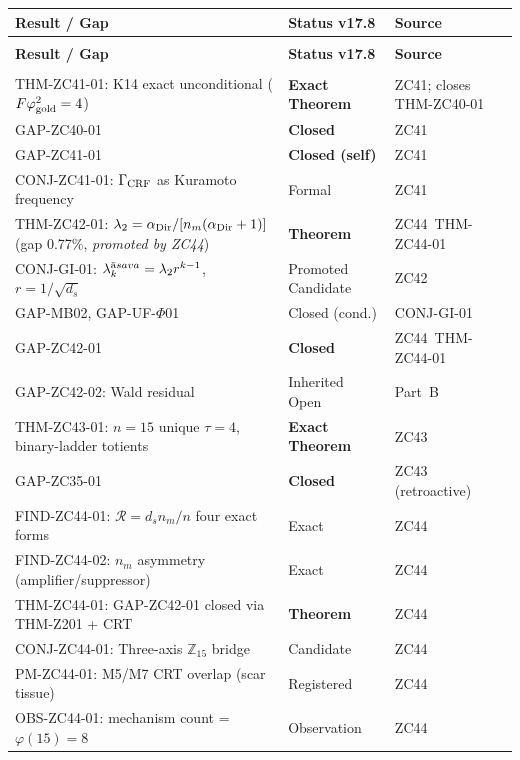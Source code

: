 \documentclass[12pt, a4paper]{article}
\begin{document}
{\small
\setlength{\LTpre}{4pt}\setlength{\LTpost}{4pt}
\renewcommand{\arraystretch}{1.30}
\begin{longtable}{>{\raggedright\arraybackslash}p{5.5cm}
                  >{\centering\arraybackslash}p{3.0cm}
                  >{\raggedright\arraybackslash}p{3.8cm}}
\toprule
\textbf{Result / Gap} & \textbf{Status v17.8} & \textbf{Source} \\
\midrule
\endfirsthead
\multicolumn{3}{l}{\small\textit{(continued)}}\\[4pt]
\toprule
\textbf{Result / Gap} & \textbf{Status v17.8} & \textbf{Source} \\
\midrule
\endhead
\midrule
\multicolumn{3}{r}{\small\textit{(continues)}}\\
\endfoot
\bottomrule
\endlastfoot

THM-ZC41-01: K14 exact unconditional ($F\varphi_{\rm gold}^2 = 4$) &
  \textbf{Exact Theorem} &
  ZC41; closes THM-ZC40-01 \\
GAP-ZC40-01 & \textbf{Closed} & ZC41 \\
GAP-ZC41-01 & \textbf{Closed (self)} & ZC41 \\
CONJ-ZC41-01: $\Gamma_{\rm CRF}$ as Kuramoto frequency &
  Formal & ZC41 \\

THM-ZC42-01: $\lambda_2 = \alpha_{\rm Dir}/[n_m(\alpha_{\rm Dir}+1)]$
  (gap 0.77\%, \emph{promoted by ZC44}) &
  \textbf{Theorem} & ZC44~THM-ZC44-01 \\
CONJ-GI-01: $\lambda_k^{\bar{\rm a}sava} = \lambda_2 r^{k-1}$,
  $r = 1/\sqrt{d_s}$ &
  Promoted Candidate & ZC42 \\
GAP-MB02, GAP-UF-$\Phi$01 &
  Closed (cond.) & CONJ-GI-01 \\
GAP-ZC42-01 & \textbf{Closed} & ZC44~THM-ZC44-01 \\
GAP-ZC42-02: Wald residual &
  Inherited Open & Part~B \\

THM-ZC43-01: $n=15$ unique $\tau=4$, binary-ladder totients &
  \textbf{Exact Theorem} & ZC43 \\
GAP-ZC35-01 & \textbf{Closed} & ZC43 (retroactive) \\

FIND-ZC44-01: $\mathcal{R} = d_s n_m/n$ four exact forms &
  Exact & ZC44 \\
FIND-ZC44-02: $n_m$ asymmetry (amplifier/suppressor) &
  Exact & ZC44 \\
THM-ZC44-01: GAP-ZC42-01 closed via THM-Z201 + CRT &
  \textbf{Theorem} & ZC44 \\
CONJ-ZC44-01: Three-axis $\mathbb{Z}_{15}$ bridge &
  Candidate & ZC44 \\
PM-ZC44-01: M5/M7 CRT overlap (scar tissue) &
  Registered & ZC44 \\
OBS-ZC44-01: mechanism count = $\varphi(15) = 8$ &
  Observation & ZC44 \\


\end{longtable}}
\end{document}
